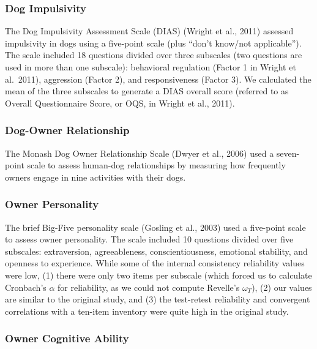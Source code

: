 \documentclass[
  pub,floatsintext]{apa6}
\begin{document}
\hypertarget{dog-impulsivity}{%
\subsubsection{Dog Impulsivity}\label{dog-impulsivity}}

The Dog Impulsivity Assessment Scale (DIAS) (Wright et al., 2011) assessed impulsivity in dogs using a five-point scale (plus ``don't know/not applicable''). The scale included 18 questions divided over three subscales (two questions are used in more than one subscale): behavioral regulation (Factor 1 in Wright et al.~2011), aggression (Factor 2), and responsiveness (Factor 3). We calculated the mean of the three subscales to generate a DIAS overall score (referred to as Overall Questionnaire Score, or OQS, in Wright et al., 2011).

\hypertarget{dog-owner-relationship}{%
\subsubsection{Dog-Owner Relationship}\label{dog-owner-relationship}}

The Monash Dog Owner Relationship Scale (Dwyer et al., 2006) used a seven-point scale to assess human-dog relationships by measuring how frequently owners engage in nine activities with their dogs.

\hypertarget{owner-personality}{%
\subsubsection{Owner Personality}\label{owner-personality}}

The brief Big-Five personality scale (Gosling et al., 2003) used a five-point scale to assess owner personality. The scale included 10 questions divided over five subscales: extraversion, agreeableness, conscientiousness, emotional stability, and openness to experience. While some of the internal consistency reliability values were low, (1) there were only two items per subscale (which forced us to calculate Cronbach's \(\alpha\) for reliability, as we could not compute Revelle's \(\omega_{T}\)), (2) our values are similar to the original study, and (3) the test-retest reliability and convergent correlations with a ten-item inventory were quite high in the original study.

\hypertarget{owner-cognitive-ability}{%
\subsubsection{Owner Cognitive Ability}\label{owner-cognitive-ability}}
\end{document}
